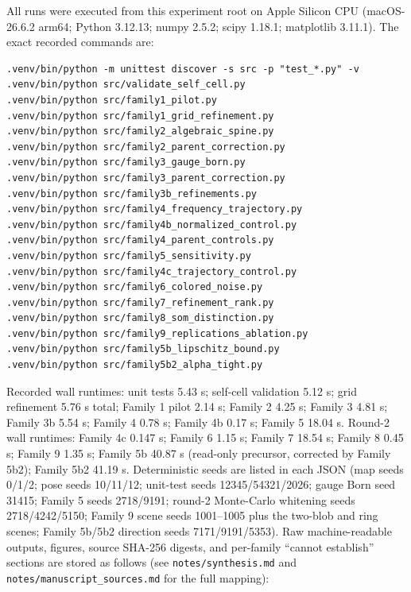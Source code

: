 \documentclass[12pt]{article}
\begin{document}
All runs were executed from this experiment root on Apple Silicon CPU
(macOS-26.6.2 arm64; Python 3.12.13; numpy 2.5.2; scipy 1.18.1; matplotlib
3.11.1). The exact recorded commands are:
\begin{verbatim}
.venv/bin/python -m unittest discover -s src -p "test_*.py" -v
.venv/bin/python src/validate_self_cell.py
.venv/bin/python src/family1_pilot.py
.venv/bin/python src/family1_grid_refinement.py
.venv/bin/python src/family2_algebraic_spine.py
.venv/bin/python src/family2_parent_correction.py
.venv/bin/python src/family3_gauge_born.py
.venv/bin/python src/family3_parent_correction.py
.venv/bin/python src/family3b_refinements.py
.venv/bin/python src/family4_frequency_trajectory.py
.venv/bin/python src/family4b_normalized_control.py
.venv/bin/python src/family4_parent_controls.py
.venv/bin/python src/family5_sensitivity.py
.venv/bin/python src/family4c_trajectory_control.py
.venv/bin/python src/family6_colored_noise.py
.venv/bin/python src/family7_refinement_rank.py
.venv/bin/python src/family8_som_distinction.py
.venv/bin/python src/family9_replications_ablation.py
.venv/bin/python src/family5b_lipschitz_bound.py
.venv/bin/python src/family5b2_alpha_tight.py
\end{verbatim}
Recorded wall runtimes: unit tests 5.43 s; self-cell validation 5.12 s;
grid refinement 5.76 s total; Family 1 pilot 2.14 s; Family 2 4.25 s; Family 3
4.81 s; Family 3b 5.54 s; Family 4 0.78 s; Family 4b 0.17 s; Family 5 18.04 s.
Round-2 wall runtimes: Family 4c 0.147 s; Family 6 1.15 s; Family 7 18.54 s;
Family 8 0.45 s; Family 9 1.35 s; Family 5b 40.87 s (read-only precursor,
corrected by Family 5b2); Family 5b2 41.19 s.
Deterministic seeds are listed in each JSON (map seeds 0/1/2; pose seeds
10/11/12; unit-test seeds 12345/54321/2026; gauge Born seed 31415; Family 5
seeds 2718/9191; round-2 Monte-Carlo whitening seeds 2718/4242/5150; Family 9
scene seeds 1001--1005 plus the two-blob and ring scenes; Family 5b/5b2
direction seeds 7171/9191/5353). Raw machine-readable outputs, figures, source SHA-256
digests, and per-family ``cannot establish'' sections are stored as follows
(see \texttt{notes/synthesis.md} and \texttt{notes/manuscript\_sources.md} for the full
mapping):
\end{document}
